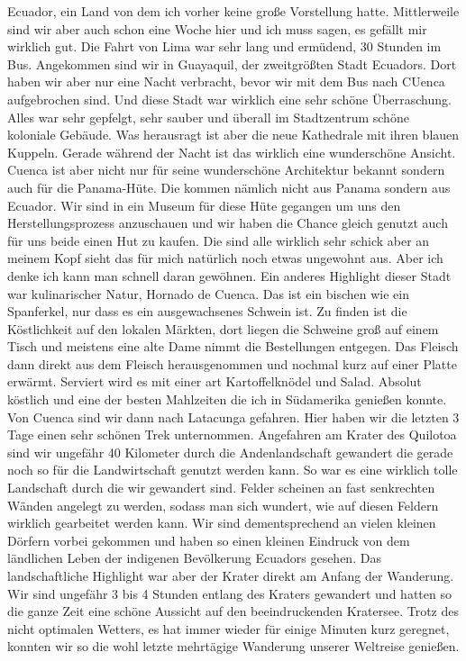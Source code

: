 \documentclass[11pt]{book}
\begin{document}
Ecuador, ein Land von dem ich vorher keine große Vorstellung hatte. Mittlerweile sind wir aber auch schon eine Woche hier und ich muss sagen, es gefällt 
mir wirklich gut. Die Fahrt von Lima war sehr lang und ermüdend, 30 Stunden im Bus. Angekommen sind wir in Guayaquil, der zweitgrößten Stadt Ecuadors. 
Dort haben wir aber nur eine Nacht verbracht, bevor wir mit dem Bus nach CUenca aufgebrochen sind. Und diese Stadt war wirklich eine sehr schöne Überraschung. 
Alles war sehr gepfelgt, sehr sauber und überall im Stadtzentrum schöne koloniale Gebäude. Was herausragt ist aber die neue Kathedrale mit ihren blauen Kuppeln. 
Gerade während der Nacht ist das wirklich eine wunderschöne Ansicht. Cuenca ist aber nicht nur für seine wunderschöne Architektur bekannt sondern auch 
für die Panama-Hüte. Die kommen nämlich nicht aus Panama sondern aus Ecuador. Wir sind in ein Museum für diese Hüte gegangen um uns den Herstellungsprozess 
anzuschauen und wir haben die Chance gleich genutzt auch für uns beide einen Hut zu kaufen. Die sind alle wirklich sehr schick aber an meinem Kopf sieht das 
für mich natürlich noch etwas ungewohnt aus. Aber ich denke ich kann man schnell daran gewöhnen. Ein anderes Highlight dieser Stadt war kulinarischer 
Natur, Hornado de Cuenca. Das ist ein bischen wie ein Spanferkel, nur dass es ein ausgewachsenes Schwein ist. Zu finden ist die Köstlichkeit auf den lokalen 
Märkten, dort liegen die Schweine groß auf einem Tisch und meistens eine alte Dame nimmt die Bestellungen entgegen. Das Fleisch dann direkt aus dem Fleisch 
herausgenommen und nochmal kurz auf einer Platte erwärmt. Serviert wird es mit einer art Kartoffelknödel und Salad. Absolut köstlich und eine der besten Mahlzeiten 
die ich in Südamerika genießen konnte. 
Von Cuenca sind wir dann nach Latacunga gefahren. Hier haben wir die letzten 3 Tage einen sehr schönen Trek unternommen. Angefahren am Krater des Quilotoa 
sind wir ungefähr 40 Kilometer durch die Andenlandschaft gewandert die gerade noch so für die Landwirtschaft genutzt werden kann. So war es eine wirklich 
tolle Landschaft durch die wir gewandert sind. Felder scheinen an fast senkrechten Wänden angelegt zu werden, sodass man sich wundert, wie auf diesen 
Feldern wirklich gearbeitet werden kann. Wir sind dementsprechend an vielen kleinen Dörfern vorbei gekommen und haben so einen kleinen Eindruck von dem 
ländlichen Leben der indigenen Bevölkerung Ecuadors gesehen. Das landschaftliche Highlight war aber der Krater direkt am Anfang der Wanderung. Wir sind 
ungefähr 3 bis 4 Stunden entlang des Kraters gewandert und hatten so die ganze Zeit eine schöne Aussicht auf den beeindruckenden Kratersee. Trotz des nicht 
optimalen Wetters, es hat immer wieder für einige Minuten kurz geregnet, konnten wir so die wohl letzte mehrtägige Wanderung unserer Weltreise genießen. 
\end{document}

